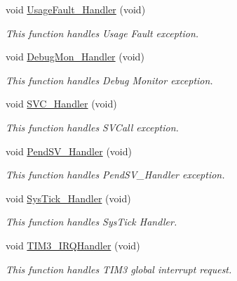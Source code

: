 \begin{DoxyCompactItemize}
void \hyperlink{group___t_i_m___time_base_ga1d98923de2ed6b7309b66f9ba2971647}{Usage\-Fault\-\_\-\-Handler} (void)
\begin{DoxyCompactList}\small\item\em This function handles Usage Fault exception. \end{DoxyCompactList}\item 
void \hyperlink{group___t_i_m___time_base_gadbdfb05858cc36fc520974df37ec3cb0}{Debug\-Mon\-\_\-\-Handler} (void)
\begin{DoxyCompactList}\small\item\em This function handles Debug Monitor exception. \end{DoxyCompactList}\item 
void \hyperlink{group___t_i_m___time_base_ga3e5ddb3df0d62f2dc357e64a3f04a6ce}{S\-V\-C\-\_\-\-Handler} (void)
\begin{DoxyCompactList}\small\item\em This function handles S\-V\-Call exception. \end{DoxyCompactList}\item 
void \hyperlink{group___t_i_m___time_base_ga6303e1f258cbdc1f970ce579cc015623}{Pend\-S\-V\-\_\-\-Handler} (void)
\begin{DoxyCompactList}\small\item\em This function handles Pend\-S\-V\-\_\-\-Handler exception. \end{DoxyCompactList}\item 
void \hyperlink{group___t_i_m___time_base_gab5e09814056d617c521549e542639b7e}{Sys\-Tick\-\_\-\-Handler} (void)
\begin{DoxyCompactList}\small\item\em This function handles Sys\-Tick Handler. \end{DoxyCompactList}\item 
void \hyperlink{group___t_i_m___time_base_gac8e51d2183b5230cbd5481f8867adce9}{T\-I\-M3\-\_\-\-I\-R\-Q\-Handler} (void)
\begin{DoxyCompactList}\small\item\em This function handles T\-I\-M3 global interrupt request. \end{DoxyCompactList}\end{DoxyCompactItemize}
